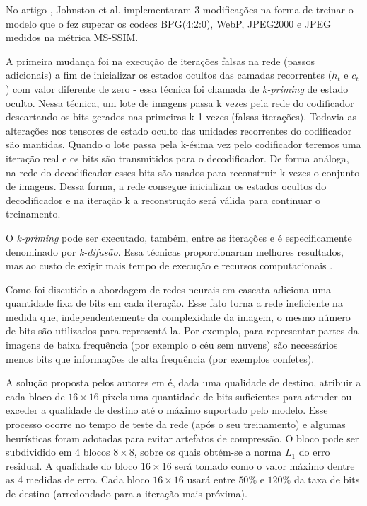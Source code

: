 

No artigo \cite{Priming2017Johnston}, Johnston et al. implementaram 3 modificações na forma de treinar o modelo que o fez superar os codecs BPG(4:2:0), WebP, JPEG2000 e JPEG medidos na métrica MS-SSIM. 

A primeira mudança foi na execução de iterações falsas na rede (passos adicionais) a fim de inicializar os estados ocultos das camadas recorrentes ($h_t$ e $c_t$) com valor diferente de zero - essa técnica foi chamada de \textit{k-priming} de estado oculto.
Nessa técnica, um lote de imagens passa k vezes pela rede do codificador descartando os bits gerados nas primeiras k-1 vezes (falsas iterações). Todavia as alterações nos tensores de estado oculto das unidades recorrentes do codificador são mantidas. Quando o lote passa pela k-ésima vez pelo codificador teremos uma iteração real e os bits são transmitidos para o decodificador. 
De forma análoga, na rede do decodificador esses bits são usados para reconstruir k vezes o conjunto de imagens. Dessa forma, a rede consegue inicializar os estados ocultos do decodificador e na iteração k a reconstrução será válida para continuar o treinamento.    

O \textit{k-priming} pode ser executado, também, entre as iterações e é especificamente denominado por \textit{k-difusão}. Essa técnicas proporcionaram melhores resultados, mas ao custo de exigir mais tempo de execução e recursos computacionais \cite{Priming2017Johnston}. 


Como foi discutido a abordagem de redes neurais em cascata adiciona uma quantidade fixa de bits em cada iteração. Esse fato torna a rede ineficiente na medida que, independentemente da complexidade da imagem, o mesmo número de bits são utilizados para representá-la.  Por exemplo, para representar partes da imagens de baixa frequência (por exemplo o céu sem nuvens) são necessários menos bits que informações de alta frequência (por exemplos confetes).

A solução proposta pelos autores em \cite{Priming2017Johnston} é, dada uma qualidade de destino, atribuir a cada bloco de $16 \times 16$ pixels uma quantidade de bits suficientes para atender ou exceder a qualidade de destino até o máximo suportado pelo modelo.
Esse processo ocorre no tempo de teste da rede (após o seu treinamento) e algumas  heurísticas foram adotadas para evitar artefatos de compressão. O bloco pode ser subdividido em 4 blocos  $8 \times 8$, sobre os quais obtém-se a norma $L_1$ do erro residual. A qualidade do bloco $16 \times 16$ será tomado como o valor máximo dentre as 4 medidas de erro. Cada bloco $16 \times 16$ usará entre $50\%$ e $120\%$ da taxa de bits de destino (arredondado para a iteração mais próxima). 

